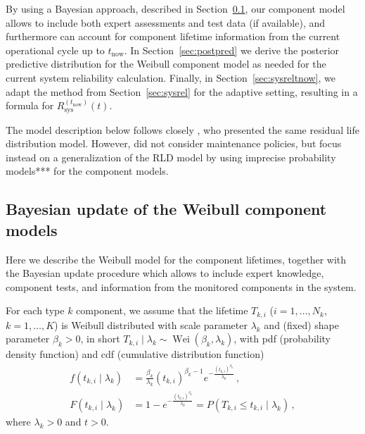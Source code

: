 \documentclass[authoryear]{elsarticle}
\newcommand{\wei}{\operatorname{Wei}} %
\def\tnow{t_\text{now}}
\newcommand{\Rsysnow}{R^{(t_\text{now})}_\text{sys}}
\begin{document}
By using a Bayesian approach, described in Section~\ref{sec:weibull},
our component model allows to include both expert assessments and test data (if available),
and furthermore can account for component lifetime information from the current operational cycle up to $\tnow$.
%
In Section~\ref{sec:postpred} we derive the posterior predictive distribution
for the Weibull component model as needed for the current system reliability calculation.
Finally, in Section~\ref{sec:sysreltnow}, we adapt the method from Section~\ref{sec:sysrel} for the adaptive setting,
resulting in a formula for $\Rsysnow(t)$.

The model description below follows closely \cite[\S 2, \S 4.1 -- \S 4.3]{2016:walter-coolen},
who presented the same residual life distribution model.
However, \cite{2016:walter-coolen} did not consider maintenance policies,
but focus instead on a generalization of the RLD model by using imprecise probability models*** for the component models.


\subsection{Bayesian update of the Weibull component models}
\label{sec:weibull}

Here we describe the Weibull model for the component lifetimes,
together with the Bayesian update procedure which allows to include
expert knowledge, component tests, and information from the monitored components in the system.

For each type $k$ component, we assume that the lifetime $T_{k,i}$ ($i=1,\ldots,N_k$, $k = 1, \ldots, K$)
is Weibull distributed with scale parameter $\lambda_k$ and (fixed) shape parameter $\beta_k > 0$,
in short $T_{k,i} \mid \lambda_k \sim \wei(\beta_k,\lambda_k)$,
with pdf (probability density function) and cdf (cumulative distribution function)
\begin{align}
\label{eq:weibulldens}
f(t_{k,i} \mid \lambda_k) &= \frac{\beta_k}{\lambda_k} (t_{k,i})^{\beta_k-1} e^{-\frac{(t_{k,i})^{\beta_k}}{\lambda_k}}\,, \\
\label{eq:weibullcdf}
F(t_{k,i} \mid \lambda_k) &= 1 - e^{-\frac{(t_{k,i})^{\beta_k}}{\lambda_k}} = P(T_{k,i} \leq t_{k,i} \mid \lambda_k)\,,
\end{align}
where $\lambda_k > 0$ and $t > 0$.
\end{document}
